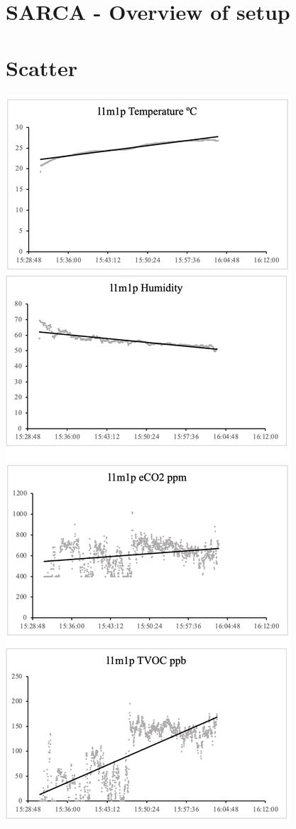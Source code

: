 \documentclass{ueacmpstyle}
\begin{document}
        \section{SARCA - Overview of setup}\label{app:finishedproject}
        
        \section{Scatter}
            \includegraphics[scale=0.3]{Images/l1m1p.png}
\end{document}
